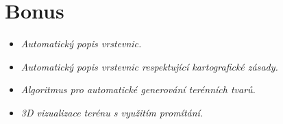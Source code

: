\section{Bonus}

\begin{itemize}
    \item \textit{Automatický popis vrstevnic.}
    \item \textit{Automatický popis vrstevnic respektující kartografické zásady.}
    \item \textit{Algoritmus pro automatické generování terénních tvarů.}
    \item \textit{3D vizualizace terénu s využitím promítání.}
\end{itemize}
